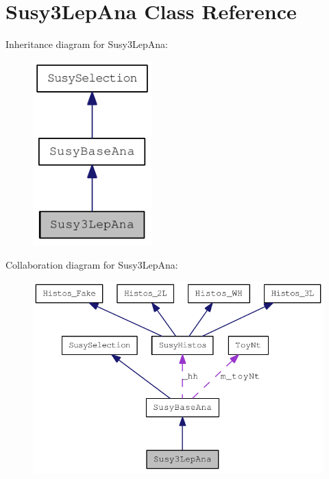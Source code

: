 \hypertarget{classSusy3LepAna}{
\section{Susy3LepAna Class Reference}
\label{classSusy3LepAna}
}
Inheritance diagram for Susy3LepAna:\nopagebreak
\begin{figure}[H]
\begin{center}
\leavevmode
\includegraphics[width=130pt]{classSusy3LepAna__inherit__graph}
\end{center}
\end{figure}
Collaboration diagram for Susy3LepAna:\nopagebreak
\begin{figure}[H]
\begin{center}
\leavevmode
\includegraphics[width=372pt]{classSusy3LepAna__coll__graph}
\end{center}
\end{figure}
